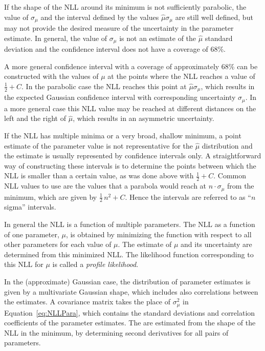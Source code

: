 If the shape of the NLL around its minimum is not sufficiently parabolic, the value of $\sigma_\mu$ and the interval defined by the values
$\hat{\mu}$\textpm$\sigma_\mu$ are still well defined, but may not provide the desired measure of the uncertainty in the parameter
estimate.  In general, the value of $\sigma_\mu$ is not an estimate of the $\hat{\mu}$ standard deviation and the confidence interval does
not have a coverage of 68\%.

A more general confidence interval with a coverage of approximately 68\% can be constructed with the values of $\mu$ at the points where
the NLL reaches a value of $\tfrac{1}{2}+C$. In the parabolic case the NLL reaches this point at $\hat{\mu}$\textpm$\sigma_\mu$, which
results in the expected Gaussian confidence interval with corresponding uncertainty $\sigma_\mu$. In a more general case this NLL value
may be reached at different distances on the left and the right of $\hat{\mu}$, which results in an asymmetric uncertainty.

If the NLL has multiple minima or a very broad, shallow minimum, a point estimate of the parameter value is not representative for the
$\hat{\mu}$ distribution and the estimate is usually represented by confidence intervals only. A straightforward way of constructing these
intervals is to determine the points between which the NLL is smaller than a certain value, as was done above with $\tfrac{1}{2}+C$. Common
NLL values to use are the values that a parabola would reach at $n\cdot\sigma_\mu$ from the minimum, which are given by
$\tfrac{1}{2}\,n^2+C$. Hence the intervals are referred to as ``$n$ sigma'' intervals.

In general the NLL is a function of multiple parameters. The NLL as a function of one parameter, $\mu$, is obtained by minimizing the
function with respect to all other parameters for each value of $\mu$. The estimate of $\mu$ and its uncertainty are determined from this
minimized NLL. The likelihood function corresponding to this NLL for $\mu$ is called a \emph{profile likelihood}.

In the (approximate) Gaussian case, the distribution of parameter estimates is given by a multivariate Gaussian shape, which includes also
correlations between the estimates. A covariance matrix takes the place of $\sigma_\mu^2$ in Equation~\ref{eq:NLLPara},
which contains the standard deviations and correlation coefficients of the parameter estimates.
The  are estimated from the shape of
the NLL in the minimum, by determining second derivatives for all pairs of parameters.

